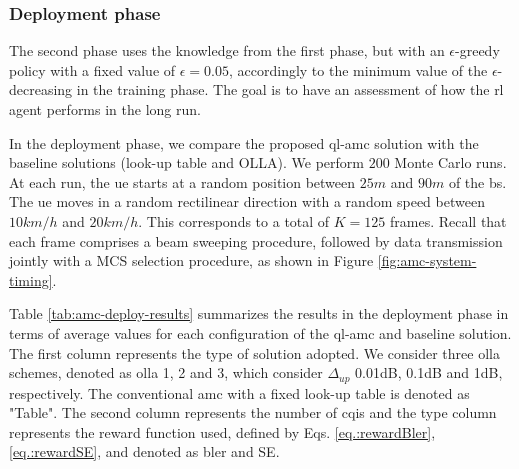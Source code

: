 \subsubsection{Deployment phase}
The second phase uses the knowledge from the first phase, but with an $\epsilon$-greedy policy with a fixed value of $\epsilon = 0.05$, accordingly to the minimum value of the $\epsilon$-decreasing in the training phase.
%
The goal is to have an assessment of how the \gls{rl} agent performs in the long run.
%

In the deployment phase, we compare the proposed \gls{ql-amc} solution with the baseline solutions (look-up table and OLLA).
%
We perform $200$ Monte Carlo runs. At each run, the \gls{ue} starts at a random position between $25m$ and $90m$ of the \gls{bs}.
%
The \gls{ue} moves in a random rectilinear direction with a random speed between $10km/h$ and $20km/h$. This corresponds to a total of $K=125$ frames. Recall that each frame comprises a beam sweeping procedure, followed by data transmission jointly with a MCS selection procedure, as shown in Figure \ref{fig:amc-system-timing}.
%


Table \ref{tab:amc-deploy-results} summarizes the results in the deployment phase in terms of average values for each configuration of the \gls{ql-amc} and baseline solution.
%
The first column represents the type of solution adopted.
%
%
We consider three \gls{olla} schemes, denoted as \gls{olla} 1, 2 and 3, which consider $\Delta_{up}$ 0.01dB, 0.1dB and 1dB, respectively.
%
The conventional \gls{amc} with a fixed look-up table is denoted as "Table".
%
The second column represents the number of \gls{cqi}s and the type column represents the reward function used, defined by Eqs. \eqref{eq.:rewardBler}, \eqref{eq.:rewardSE}, and denoted as \gls{bler} and SE.
%

